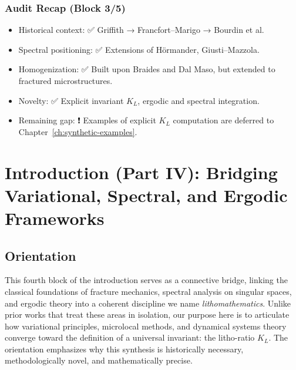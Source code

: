 \subsection*{Audit Recap (Block 3/5)}
\begin{itemize}
  \item Historical context: ✅ Griffith → Francfort–Marigo → Bourdin et al.
  \item Spectral positioning: ✅ Extensions of Hörmander, Giusti–Mazzola.
  \item Homogenization: ✅ Built upon Braides and Dal Maso, but extended to
  fractured microstructures.
  \item Novelty: ✅ Explicit invariant $K_L$, ergodic and spectral integration.
  \item Remaining gap: ❗ Examples of explicit $K_L$ computation are deferred to
  Chapter~\ref{ch:synthetic-examples}.
\end{itemize}

\bigskip

\chapter{Introduction (Part IV): Bridging Variational, Spectral, and Ergodic Frameworks}

\section*{Orientation}
This fourth block of the introduction serves as a connective bridge, linking the classical foundations of fracture mechanics, spectral analysis on singular spaces, and ergodic theory into a coherent discipline we name \emph{lithomathematics}. Unlike prior works that treat these areas in isolation, our purpose here is to articulate how variational principles, microlocal methods, and dynamical systems theory converge toward the definition of a universal invariant: the litho-ratio $K_L$. The orientation emphasizes why this synthesis is historically necessary, methodologically novel, and mathematically precise.

